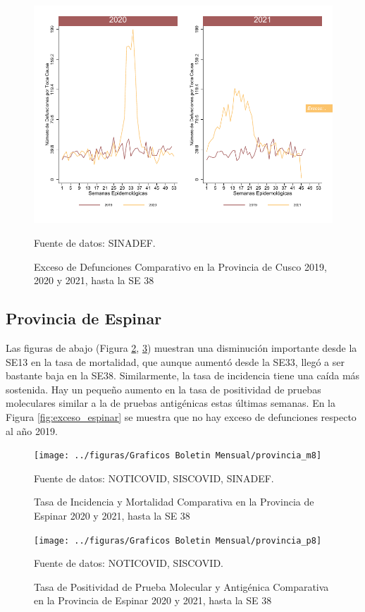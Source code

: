 \documentclass[12pt,a4paper,openany]{book}
\begin{document}
	\begin{figure}[h]
	\caption{Exceso de Defunciones Comparativo en la Provincia de Cusco 2019, 2020 y 2021, hasta la SE 38}\label{fig:exceso_cusco}
	\begin{center}
		\includegraphics[width=0.7\linewidth]{../figuras/exceso_7}
	\end{center}
	{\footnotesize {Fuente de datos: SINADEF.}}
	\end{figure}

\clearpage

	\subsection*{Provincia de Espinar}
	\noindent Las figuras de abajo (Figura \ref{fig:inc_mort_espinar}, \ref{fig:positividad_espinar})  muestran una disminución importante desde la SE13 en la tasa de mortalidad, que aunque aumentó desde la SE33, llegó a ser bastante baja en la SE38. Similarmente, la tasa de incidencia tiene una caída más sostenida. Hay un pequeño aumento en la tasa de positividad de pruebas moleculares similar a la de pruebas antigénicas estas últimas semanas. En la Figura \ref{fig:exceso_espinar} se muestra que no hay exceso de defunciones respecto al año 2019.

	\begin{figure}[h]
	\caption{Tasa de Incidencia y Mortalidad Comparativa en la Provincia de Espinar 2020 y 2021, hasta la SE 38}\label{fig:inc_mort_espinar}
	\begin{center}
		\texttt{[image: ../figuras/Graficos Boletin Mensual/provincia\_m8]}
	\end{center}
	{\footnotesize {Fuente de datos: NOTICOVID, SISCOVID, SINADEF.}}
	\end{figure}

	\begin{figure}[h]
	\caption{Tasa de Positividad de Prueba Molecular y Antigénica Comparativa en la Provincia de Espinar 2020 y 2021, hasta la SE 38}\label{fig:positividad_espinar}
	\begin{center}
		\texttt{[image: ../figuras/Graficos Boletin Mensual/provincia\_p8]}
	\end{center}
	{\footnotesize {Fuente de datos: NOTICOVID, SISCOVID.}}
	\end{figure}
\end{document}
